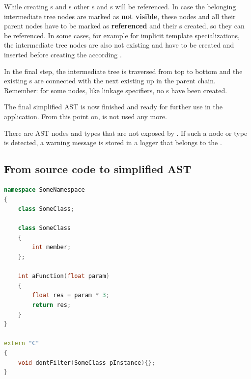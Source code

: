 While creating s and s other s and s will be referenced. In case the belonging intermediate tree nodes are marked as \textbf{not visible}, these nodes and all their parent nodes have to be marked as \textbf{referenced} and their s created, so they can be referenced. In some cases, for example for implicit template specializations, the intermediate tree nodes are also not existing and have to be created and inserted before creating the according .

In the final step, the intermediate tree is traversed from top to bottom and the existing s are connected with the next existing  up in the parent chain. Remember: for some nodes, like linkage specifiers, no s have been created.

The final simplified AST is now finished and ready for further use in the application. From this point on,  is not used any more.

There are AST nodes and types that are not exposed by . If such a node or type is detected, a warning message is stored in a logger that belongs to the .

\newpage
\subsection{From source code to simplified AST}
\SingleSpacing
\begin{lstlisting}[language=C++, caption=Example input code for \myProperName{CPPAnalyzer}]
namespace SomeNamespace
{
	class SomeClass;
	
	class SomeClass
	{
		int member;
	};
	
	int aFunction(float param)
	{
		float res = param * 3;
		return res;
	}
}

extern "C"
{
	void dontFilter(SomeClass pInstance){};
}
\end{lstlisting}
\OnehalfSpacing

